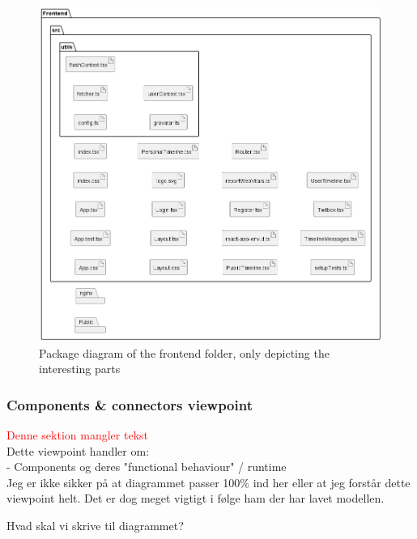 \begin{figure}[H]
 \centering
 \includegraphics[width = \textwidth]{Images/package_frontend.png}
 \caption{Package diagram of the frontend folder, only depicting the interesting parts}
 \label{fig:FrontendPackageDiagram}
\end{figure}


\subsubsection{Components \& connectors viewpoint}
\textcolor{red}{Denne sektion mangler tekst}\\
Dette viewpoint handler om: \\
- Components og deres "functional behaviour" / runtime \\
Jeg er ikke sikker på at diagrammet passer 100\% ind her eller at jeg forstår dette viewpoint helt. Det er dog meget vigtigt i følge ham der har lavet modellen. 


Hvad skal vi skrive til diagrammet?

